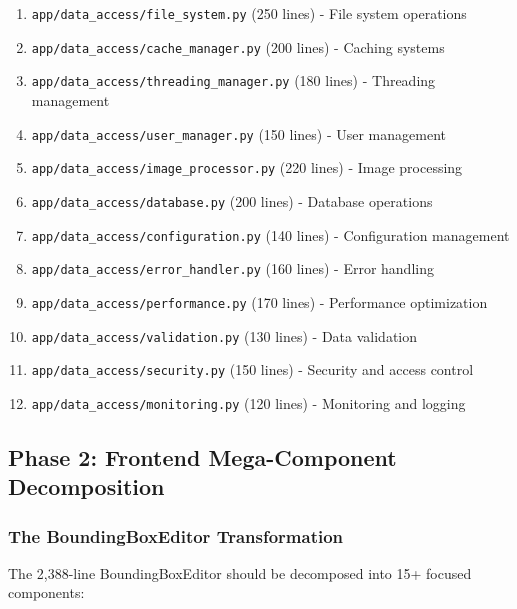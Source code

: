 \documentclass[11pt]{article}
\begin{document}
\begin{enumerate}
\item \texttt{app/data\_access/file\_system.py} (250 lines) - File system operations
\item \texttt{app/data\_access/cache\_manager.py} (200 lines) - Caching systems
\item \texttt{app/data\_access/threading\_manager.py} (180 lines) - Threading management
\item \texttt{app/data\_access/user\_manager.py} (150 lines) - User management
\item \texttt{app/data\_access/image\_processor.py} (220 lines) - Image processing
\item \texttt{app/data\_access/database.py} (200 lines) - Database operations
\item \texttt{app/data\_access/configuration.py} (140 lines) - Configuration management
\item \texttt{app/data\_access/error\_handler.py} (160 lines) - Error handling
\item \texttt{app/data\_access/performance.py} (170 lines) - Performance optimization
\item \texttt{app/data\_access/validation.py} (130 lines) - Data validation
\item \texttt{app/data\_access/security.py} (150 lines) - Security and access control
\item \texttt{app/data\_access/monitoring.py} (120 lines) - Monitoring and logging
\end{enumerate}

\subsection{Phase 2: Frontend Mega-Component Decomposition}

\subsubsection{The BoundingBoxEditor Transformation}

The 2,388-line BoundingBoxEditor should be decomposed into 15+ focused components:
\end{document}
